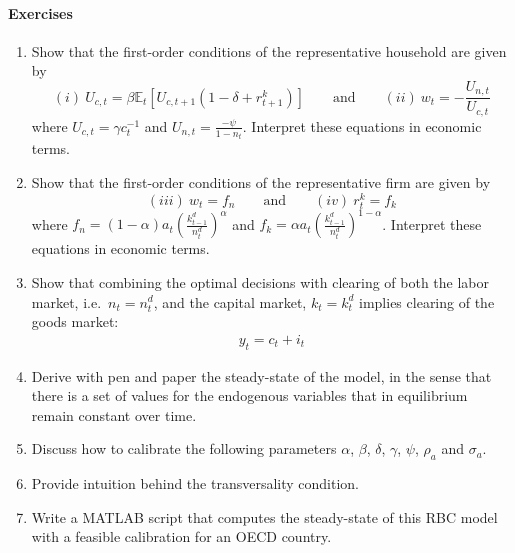 \paragraph{Exercises}

\begin{enumerate}

\item
Show that the first-order conditions of the representative household are given by
\begin{equation*}
(i)~U_{c,t} = \beta \mathbb{E}_{t}\left[U_{c,t+1} \left(1-\delta + r^{k}_{t+1}\right)\right] \qquad \text{and} \qquad
(ii)~w_t = -\frac{U_{n,t}}{U_{c,t}}
\end{equation*}
where \(U_{c,t} = \gamma c_t^{-1}\) and \(U_{n,t} = \frac{-\psi}{1-n_t}\).
Interpret these equations in economic terms.

\item
Show that the first-order conditions of the representative firm are given by
\begin{equation*}
(iii)~w_t = f_n \qquad \text{and} \qquad
(iv)~r^{k}_{t} = f_k
\end{equation*}
where \(f_n = (1-\alpha) a_t {\left(\frac{k^{d}_{t-1}}{n^{d}_{t}}\right)}^{\alpha}\)
and \(f_k = \alpha a_t {\left(\frac{k^{d}_{t-1}}{n^{d}_{t}}\right)}^{1-\alpha}\).
Interpret these equations in economic terms.

\item
Show that combining the optimal decisions with clearing of both the labor market, i.e.\
  \(n_t = n^{d}_{t}\), and the capital market, \(k_{t} = k^{d}_{t}\) implies clearing of the goods market:
\begin{align*}
y_t = c_t + i_t
\end{align*}

\item
Derive with pen and paper the steady-state of the model,
  in the sense that there is a set of values for the endogenous variables
  that in equilibrium remain constant over time.

\item
Discuss how to calibrate the following parameters \(\alpha \), \(\beta \), \(\delta \), \(\gamma \), \(\psi \), \(\rho_a \) and \(\sigma_a \).

\item
Provide intuition behind the transversality condition.

\item
Write a MATLAB script that computes the steady-state of this RBC model
  with a feasible calibration for an OECD country.


\end{enumerate}
